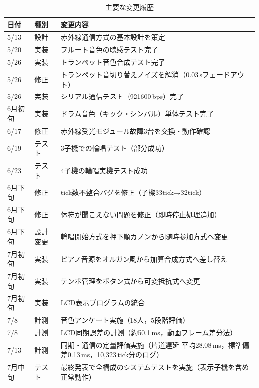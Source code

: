 \documentclass[uplatex,dvipdfmx]{jlreq}
\begin{document}
\begin{table}[tb]
\caption{主要な変更履歴}
\label{tab:changelog}
\begin{center}
\small
\begin{tabular}{llp{}}
\hline
日付 & 種別 & 変更内容 \\
\hline
5/13 & 設計 & 赤外線通信方式の基本設計を策定 \\
5/20 & 実装 & フルート音色の聴感テスト完了 \\
5/26 & 実装 & トランペット音色合成テスト完了 \\
5/26 & 修正 & トランペット音切り替えノイズを解消（0.03\,sフェードアウト） \\
5/26 & 実装 & シリアル通信テスト（921600\,bps）完了 \\
6月初旬 & 実装 & ドラム音色（キック・シンバル）単体テスト完了 \\
6/17 & 修正 & 赤外線受光モジュール故障3台を交換・動作確認 \\
6/19 & テスト & 3子機での輪唱テスト（部分成功） \\
6/23 & テスト & 4子機の輪唱実機テスト成功 \\
6月下旬 & 修正 & tick数不整合バグを修正（子機33tick→32tick） \\
6月下旬 & 修正 & 休符が聞こえない問題を修正（即時停止処理追加） \\
6月下旬 & 設計変更 & 輪唱開始方式を押下順カノンから随時参加方式へ変更 \\
7月初旬 & 実装 & ピアノ音源をオルガン風から加算合成方式へ差し替え \\
7月初旬 & 実装 & テンポ管理をボタン式から可変抵抗式へ変更 \\
7月初旬 & 実装 & LCD表示プログラムの統合 \\
7/8 & 計測 & 音色アンケート実施（18人，5段階評価） \\
7/8 & 計測 & LCD同期誤差の計測（約50.1\,ms，動画フレーム差分法） \\
7/13 & 計測 & 同期・通信の定量評価実施（片道遅延 平均28.08\,ms，標準偏差0.13\,ms，10{,}323\,tick分のログ） \\
7月中旬 & テスト & 最終発表で全構成のシステムテストを実施（表示子機を含め正常動作） \\
\hline
\end{tabular}
\end{center}
\end{table}
\end{document}
